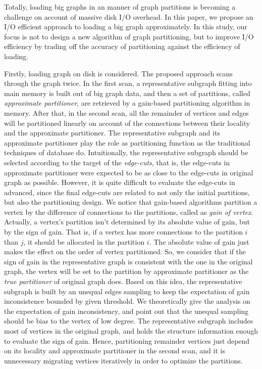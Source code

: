 \documentclass{sig-alternate-2013}
\begin{document}
Totally, loading big graphs in an manner of graph partitions is becoming a challenge on account of massive disk I/O overhead. In this paper, we propose an I/O efficient approach to loading a big graph approximately. In this study, our focus is not to design a new algorithm of graph partitioning, but to improve I/O efficiency by trading off the accuracy of partitioning against the efficiency of loading.

Firstly, loading graph on disk is considered. The proposed approach scans through the graph twice. In the first scan, a representative subgraph fitting into main memory is built out of big graph data, and then a set of partitions, called \textit{approximate partitioner}, are retrieved by a gain-based partitioning algorithm in memory. After that, in the second scan, all the remainder of vertices and edges will be partitioned linearly on account of the connections between their locality and the approximate partitioner.
The representative subgraph and its approximate partitioner play the role as partitioning function as the traditional techniques of database do. Intuitionally, the representative subgraph should be selected according to the target of the \textit{edge-cuts}, that is, the edge-cuts in approximate partitioner were expected to be as close to the edge-cuts in original graph as possible. However, it is quite difficult to evaluate the edge-cuts in advanced, since the final edge-cuts are related to not only the initial partitions, but also the partitioning design. We notice that gain-based algorithms partition a vertex by the difference of connections to the partitions, called as \textit{gain of vertex}. Actually, a vertex's partition isn't determined by its absolute value of gain, but by the sign of gain. That is, if a vertex has more connections to the partition $i$ than $j$, it should be allocated in the partition $i$. The absolute value of gain just makes the effect on the order of vertex partitioned. So, we consider that if the sign of gain in the representative graph is consistent with the one in the original graph, the vertex will be set to the partition by approximate partitioner as the \textit{true partitioner} of original graph does. Based on this idea, the representative subgraph is built by an unequal edges sampling to keep the expectation of gain inconsistence bounded by given threshold. We theoretically give the analysis on the expectation of gain inconsistency, and point out that the unequal sampling should be bias to the vertex of low degree.
The representative subgraph includes most of vertices in the original graph, and holds the structure information enough to evaluate the sign of gain. Hence, partitioning remainder vertices just depend on its locality and approximate partitioner in the second scan, and it is unnecessary migrating vertices iteratively in order to optimize the partitions. 
\end{document}
